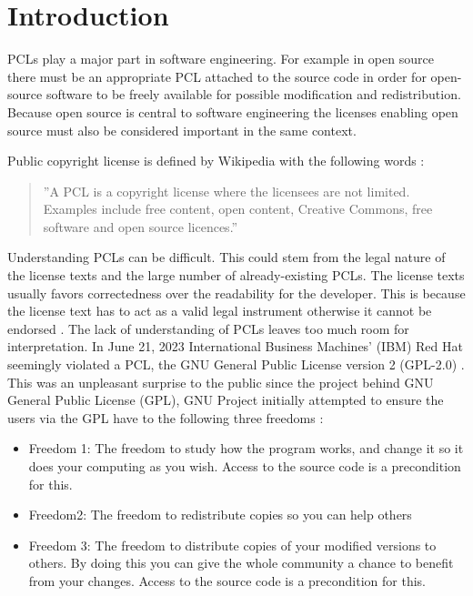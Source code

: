\chapter{Introduction\label{intro}}

PCLs play a major part in software engineering. For example in open source there must be an appropriate PCL attached to the source code in order for open-source software to be freely available for possible modification and redistribution. Because open source is central to software engineering the licenses enabling open source must also be considered important in the same context.

Public copyright license is defined by Wikipedia with the following words :
\begin{quote}
	''A PCL is a copyright license where the licensees are not limited. Examples include free content, open content, Creative Commons, free software and open source licences.''
\end{quote}

Understanding PCLs can be difficult. This could stem from the legal nature of the license texts and the large number of already-existing PCLs. The license texts usually favors correctedness over the readability for the developer. This is because the license text has to act as a valid legal instrument otherwise it cannot be endorsed . The lack of understanding of PCLs leaves too much room for interpretation. In June 21, 2023 International Business Machines' (IBM) Red Hat seemingly violated a PCL, the GNU General Public License version 2 (GPL-2.0)  . This was an unpleasant surprise to the public since the project behind GNU General Public License (GPL), GNU Project initially attempted to ensure the users via the GPL have to the following three freedoms :
\begin{itemize}
	\item Freedom 1:	The freedom to study how the program works, and change it so it does your computing as you wish. Access to the source code is a precondition for this.
	\item Freedom2: The freedom to redistribute copies so you can help others
	\item Freedom 3:	The freedom to distribute copies of your modified versions to others. By doing this you can give the whole community a chance to benefit from your changes. Access to the source code is a precondition for this.
\end{itemize}

